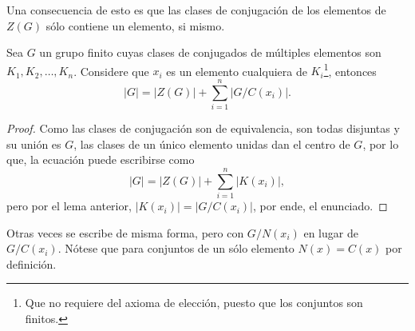 \documentclass[11pt,oneside]{book}
\begin{document}
Una consecuencia de esto es que las clases de conjugación de los elementos de $Z(G)$ sólo contiene un elemento, si mismo.
\begin{thm}
Sea $G$ un grupo finito cuyas clases de conjugados de múltiples elementos son $K_1, K_2,\dots,K_n$. Considere que $x_i$ es un elemento cualquiera de $K_i$\footnote{Que no requiere del axioma de elección, puesto que los conjuntos son finitos.}, entonces
$$|G|=|Z(G)|+\sum_{i=1}^n|G/C(x_i)|.$$
\end{thm}
\begin{proof}
Como las clases de conjugación son de equivalencia, son todas disjuntas y su unión es $G$, las clases de un único elemento unidas dan el centro de $G$, por lo que, la ecuación puede escribirse como
$$|G|=|Z(G)|+\sum_{i=1}^n|K(x_i)|,$$
pero por el lema anterior, $|K(x_i)|=|G/C(x_i)|$, por ende, el enunciado.
\end{proof}
Otras veces se escribe de misma forma, pero con $G/N(x_i)$ en lugar de $G/C(x_i)$. Nótese que para conjuntos de un sólo elemento $N(x)=C(x)$ por definición.
\end{document}
